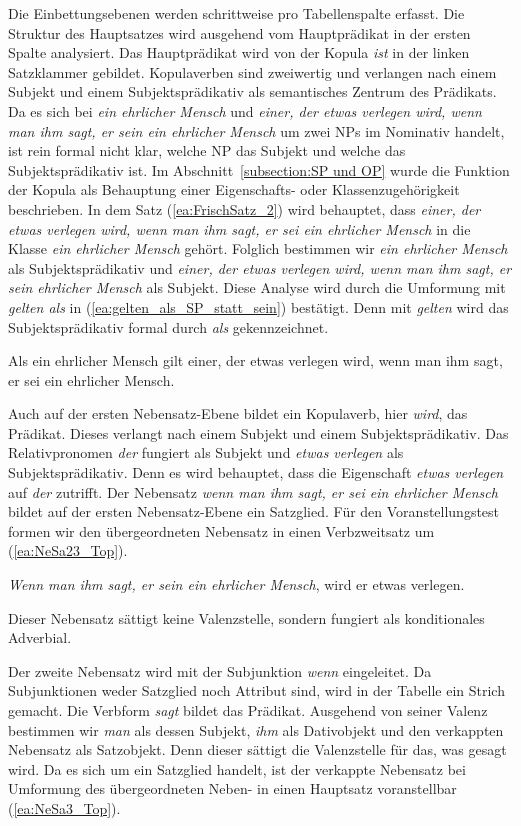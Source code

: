 Die Einbettungsebenen werden schrittweise pro Tabellenspalte erfasst. Die Struktur des Hauptsatzes wird ausgehend vom Hauptprädikat in der ersten Spalte analysiert. Das Hauptprädikat wird von der Kopula \textit{ist} in der linken Satzklammer gebildet. Kopulaverben sind zweiwertig und verlangen nach einem Subjekt und einem Subjektsprädikativ als semantisches Zentrum des Prädikats. Da es sich bei \textit{ein ehrlicher Mensch} und \textit{einer, der etwas verlegen wird, wenn man ihm sagt, er sein ein ehrlicher Mensch} um zwei NPs im Nominativ handelt, ist rein formal nicht klar, welche NP das Subjekt und welche das Subjektsprädikativ ist. Im Abschnitt~\ref{subsection:SP und OP} wurde die Funktion der Kopula als Behauptung einer Eigenschafts- oder Klassenzugehörigkeit beschrieben. In dem Satz (\ref{ea:FrischSatz_2}) wird behauptet, dass \textit{einer, der etwas verlegen wird, wenn man ihm sagt, er sei ein ehrlicher Mensch} in die Klasse \textit{ein ehrlicher Mensch} gehört. Folglich bestimmen wir \textit{ein ehrlicher Mensch} als Subjektsprädikativ und \textit{einer, der etwas verlegen wird, wenn man ihm sagt, er sein ehrlicher Mensch} als Subjekt. Diese Analyse wird durch die Umformung mit \textit{gelten als} in (\ref{ea:gelten_als_SP_statt_sein}) bestätigt. Denn mit \textit{gelten} wird das Subjektsprädikativ formal durch \textit{als} gekennzeichnet.

\ea \label{ea:gelten_als_SP_statt_sein} Als ein ehrlicher Mensch gilt einer, der etwas verlegen wird, wenn man ihm sagt, er sei ein ehrlicher Mensch.
\z 

Auch auf der ersten Nebensatz-Ebene bildet ein Kopulaverb, hier \textit{wird}, das Prädikat. Dieses verlangt nach einem Subjekt und einem Subjektsprädikativ. Das Relativpronomen \textit{der} fungiert als Subjekt und \textit{etwas verlegen} als Subjektsprädikativ. Denn es wird behauptet, dass die Eigenschaft \textit{etwas verlegen} auf \textit{der} zutrifft. Der Nebensatz \textit{wenn man ihm sagt, er sei ein ehrlicher Mensch} bildet auf der ersten Nebensatz-Ebene ein Satzglied. Für den Voranstellungstest formen wir den übergeordneten Nebensatz in einen Verbzweitsatz um (\ref{ea:NeSa23_Top}).

\ea \label{ea:NeSa23_Top} \textit{Wenn man ihm sagt, er sein ein ehrlicher Mensch}, wird er etwas verlegen.
\z 

Dieser Nebensatz sättigt keine Valenzstelle, sondern fungiert als konditionales Adverbial.

Der zweite Nebensatz wird mit der Subjunktion \textit{wenn} eingeleitet. Da Subjunktionen weder Satzglied noch Attribut sind, wird in der Tabelle ein Strich gemacht. Die Verbform \textit{sagt} bildet das Prädikat. Ausgehend von seiner Valenz bestimmen wir \textit{man} als dessen Subjekt, \textit{ihm} als Dativobjekt und den verkappten Nebensatz als Satzobjekt. Denn dieser sättigt die Valenzstelle für das, was gesagt wird. Da es sich um ein Satzglied handelt, ist der verkappte Nebensatz bei Umformung des übergeordneten Neben- in einen Hauptsatz voranstellbar (\ref{ea:NeSa3_Top}).

